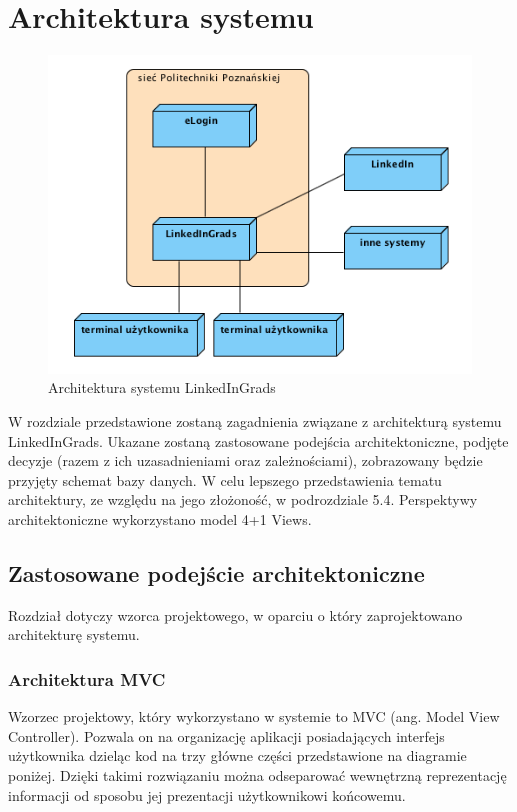 \chapter{Architektura systemu}
\label{Chapter5}

\begin{figure}[H] 
\centering\includegraphics[width=15cm]{figures/image2}
\caption{Architektura systemu LinkedInGrads}\label{rys:use-case-diagram}
\end{figure}

W rozdziale przedstawione zostaną zagadnienia związane z architekturą systemu LinkedInGrads. Ukazane zostaną zastosowane podejścia architektoniczne, podjęte decyzje (razem z ich uzasadnieniami oraz zależnościami), zobrazowany będzie przyjęty schemat bazy danych. W celu lepszego przedstawienia tematu architektury, ze względu na jego złożoność, w podrozdziale 5.4. Perspektywy architektoniczne wykorzystano model 4+1 Views.

\section{Zastosowane podejście architektoniczne}
\label{Chapter52}

Rozdział dotyczy wzorca projektowego, w oparciu o który zaprojektowano architekturę systemu.

\subsection{Architektura MVC}

Wzorzec projektowy, który wykorzystano w systemie to MVC (ang. Model View Controller). Pozwala on na organizację aplikacji posiadających interfejs użytkownika dzieląc kod na trzy główne części przedstawione na diagramie poniżej. Dzięki takimi rozwiązaniu można odseparować wewnętrzną reprezentację informacji od sposobu jej prezentacji użytkownikowi końcowemu.

